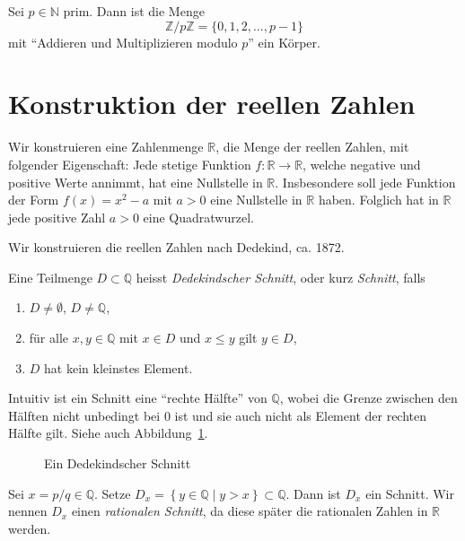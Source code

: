 \documentclass[../main.tex]{subfiles}
\begin{document}
\begin{ausblick}[Algebra]
  Sei $p \in \mathbb N$ prim. Dann ist die Menge
  \[ \mathbb Z / p \mathbb Z = \{0, 1, 2, \dots, p-1\}\]
  mit ``Addieren und Multiplizieren modulo $p$'' ein Körper.
\end{ausblick}

\section{Konstruktion der reellen Zahlen}
\begin{goal}
  Wir konstruieren eine Zahlenmenge $\mathbb R$,
  die Menge der reellen Zahlen, mit folgender
  Eigenschaft: Jede stetige Funktion $f \colon \mathbb R \to \mathbb R$,
  welche negative und positive Werte annimmt, hat eine Nullstelle
  in $\mathbb R$. Insbesondere soll jede Funktion
  der Form $f(x)=x^{2}-a$ mit $a>0$ eine Nullstelle in $\mathbb R$
  haben. Folglich hat in $\mathbb R$ jede positive Zahl
  $a > 0$ eine Quadratwurzel.
\end{goal}

Wir konstruieren die reellen Zahlen nach Dedekind, ca. 1872.
\begin{definition}
  Eine Teilmenge $D \subset \mathbb Q$ heisst
  \emph{Dedekindscher Schnitt}, oder kurz \emph{Schnitt},
  falls
  \begin{enumerate}[(1)]
    \item $D \neq \emptyset$, $D \neq \mathbb Q$,
    \item für alle $x, y \in \mathbb Q$ mit $x \in D$ und $x \leq y$ gilt $y \in D$,
    \item $D$ hat kein kleinstes Element.
  \end{enumerate}
\end{definition}

Intuitiv ist ein Schnitt eine ``rechte Hälfte'' von $\mathbb Q$, wobei
die Grenze
zwischen den Hälften
nicht unbedingt bei $0$ ist und sie auch nicht als Element der
rechten Hälfte gilt. Siehe auch Abbildung~\ref{fig:schnitt}.

\begin{figure}[htb]
  \centering
  
  \caption{Ein Dedekindscher Schnitt}%
  \label{fig:schnitt}
\end{figure}

\begin{example}
  Sei $x = p/q \in \mathbb Q$. Setze $D_{x} = \left\{y \in \mathbb Q \mid y > x\right\}
  \subset \mathbb Q$.
  Dann ist $D_{x}$ ein Schnitt. Wir nennen $D_{x}$ einen \emph{rationalen Schnitt},
  da diese später die rationalen Zahlen in $\mathbb R$ werden.
\end{example}
\end{document}
